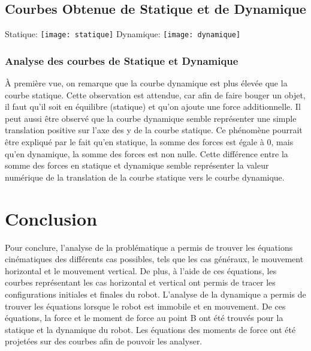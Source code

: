 \documentclass{article}
\begin{document}
\subsection{Courbes Obtenue de Statique et de Dynamique}
Statique:
\newline
\noindent \texttt{[image: statique]}
\newline
\noindent Dynamique:
\newline
\noindent \texttt{[image: dynamique]}

\subsubsection{Analyse des courbes de Statique et Dynamique}
À première vue, on remarque que la courbe dynamique est plus élevée que la courbe statique. Cette observation est attendue, car afin de faire bouger un objet, il faut qu'il soit en équilibre (statique) et qu'on ajoute une force additionnelle. Il peut aussi être observé que la courbe dynamique semble représenter une simple translation positive sur l'axe des y de la courbe statique. Ce phénomène pourrait être expliqué par le fait qu'en statique, la somme des forces est égale à 0, mais qu'en dynamique, la somme des forces est non nulle. Cette différence entre la somme des forces en statique et dynamique semble représenter la valeur numérique de la translation de la courbe statique vers le courbe dynamique.

\section{Conclusion}
Pour conclure, l'analyse de la problématique a permis de trouver les équations cinématiques des différents cas possibles, tels que les cas généraux, le mouvement horizontal et le mouvement vertical. De plus, à l'aide de ces équations, les courbes représentant les cas horizontal et vertical ont permis de tracer les configurations initiales et finales du robot. L'analyse de la dynamique a permis de trouver les équations lorsque le robot est immobile et en mouvement. De ces équations, la force et le moment de force au point B ont été trouvés pour la statique et la dynamique du robot. Les équations des moments de force ont été projetées sur des courbes afin de pouvoir les analyser.
\end{document}
